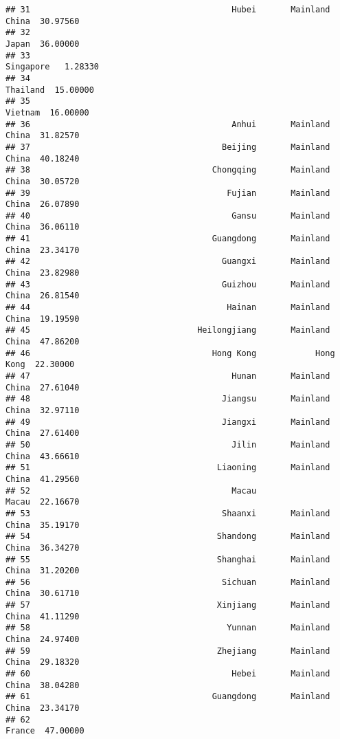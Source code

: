 \documentclass[
]{article}
\begin{document}
\begin{verbatim}
## 31                                         Hubei       Mainland China  30.97560
## 32                                                              Japan  36.00000
## 33                                                          Singapore   1.28330
## 34                                                           Thailand  15.00000
## 35                                                            Vietnam  16.00000
## 36                                         Anhui       Mainland China  31.82570
## 37                                       Beijing       Mainland China  40.18240
## 38                                     Chongqing       Mainland China  30.05720
## 39                                        Fujian       Mainland China  26.07890
## 40                                         Gansu       Mainland China  36.06110
## 41                                     Guangdong       Mainland China  23.34170
## 42                                       Guangxi       Mainland China  23.82980
## 43                                       Guizhou       Mainland China  26.81540
## 44                                        Hainan       Mainland China  19.19590
## 45                                  Heilongjiang       Mainland China  47.86200
## 46                                     Hong Kong            Hong Kong  22.30000
## 47                                         Hunan       Mainland China  27.61040
## 48                                       Jiangsu       Mainland China  32.97110
## 49                                       Jiangxi       Mainland China  27.61400
## 50                                         Jilin       Mainland China  43.66610
## 51                                      Liaoning       Mainland China  41.29560
## 52                                         Macau                Macau  22.16670
## 53                                       Shaanxi       Mainland China  35.19170
## 54                                      Shandong       Mainland China  36.34270
## 55                                      Shanghai       Mainland China  31.20200
## 56                                       Sichuan       Mainland China  30.61710
## 57                                      Xinjiang       Mainland China  41.11290
## 58                                        Yunnan       Mainland China  24.97400
## 59                                      Zhejiang       Mainland China  29.18320
## 60                                         Hebei       Mainland China  38.04280
## 61                                     Guangdong       Mainland China  23.34170
## 62                                                             France  47.00000

\end{verbatim}
\end{document}
